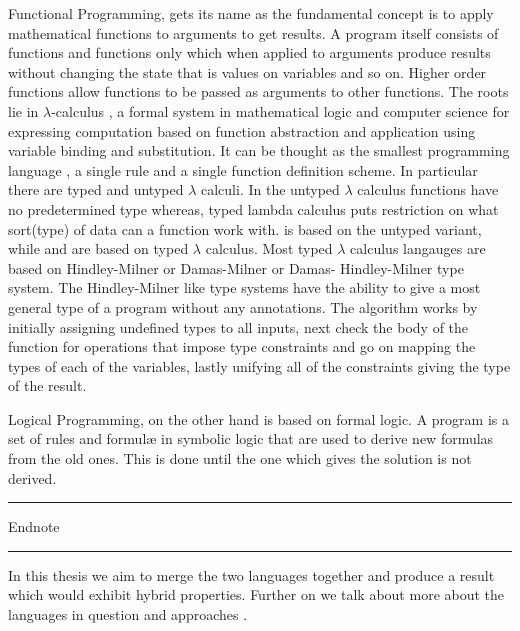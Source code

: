 \documentclass[thesis-solanki.tex]{subfiles}
\begin{document}
Functional Programming, \cite{hughes1989functional} gets its name as the fundamental concept is to apply
mathematical functions to arguments to get results.
A program itself consists of functions and functions only which when applied to arguments produce results without
changing the state that is values on variables and so on.
Higher order functions allow functions to be passed as arguments to other functions.
The roots lie in $\lambda$-calculus \cite{website:lambdacalculuswiki}, a formal system in mathematical logic and
computer science for expressing computation based on function abstraction and application using variable binding
and substitution.
It can be thought as the smallest programming language \cite{rojas2004tutorial}, a single rule and a single
function definition scheme.
In particular there are typed and untyped $\lambda$ calculi.
In the untyped $\lambda$ calculus functions have no predetermined type whereas{\large,} typed lambda calculus puts
restriction on what sort(type) of data can a function work with.
 is based on the untyped variant{\large,} while  and  are based on typed
$\lambda$ calculus.
Most typed $\lambda$ calculus langauges are based on Hindley-Milner or Damas-Milner or Damas- Hindley-Milner
\cite{website:hdmtypesystemwiki} type system.
The Hindley-Milner like type systems have the ability to give a most general type of a program without any
annotations. 
The algorithm \cite{website:hdmtypesystem} works by initially assigning undefined types to all inputs, next check
the body of the function for operations that impose type constraints and go on mapping the types of each of the
variables, lastly unifying all of the constraints giving the type of the result.

Logical Programming, \cite{spivey1995introduction} on the other hand is based on formal logic.
A program is a set of rules and formul\ae{} in symbolic logic that are used to derive new formulas from the old
ones.
This is done until the one which gives the solution is not derived.

\noindent
\textcolor{blue}{\rule{0.40\textwidth}{2pt}}
Endnote
\textcolor{blue}{\rule{0.40\textwidth}{2pt}}\par
In this thesis we aim to merge the two languages
together and produce a result which would exhibit hybrid
properties.
Further on we talk about more about the languages in question and approaches .
\end{document}
